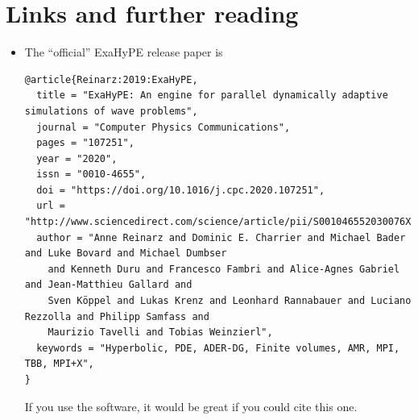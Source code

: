 \section*{Links and further reading}

\begin{itemize}
  \item The ``official'' ExaHyPE release paper is
{\tiny \begin{verbatim}
@article{Reinarz:2019:ExaHyPE,   
  title = "ExaHyPE: An engine for parallel dynamically adaptive simulations of wave problems",
  journal = "Computer Physics Communications",
  pages = "107251",
  year = "2020",
  issn = "0010-4655",
  doi = "https://doi.org/10.1016/j.cpc.2020.107251",
  url = "http://www.sciencedirect.com/science/article/pii/S001046552030076X",
  author = "Anne Reinarz and Dominic E. Charrier and Michael Bader and Luke Bovard and Michael Dumbser 
    and Kenneth Duru and Francesco Fambri and Alice-Agnes Gabriel and Jean-Matthieu Gallard and 
    Sven Köppel and Lukas Krenz and Leonhard Rannabauer and Luciano Rezzolla and Philipp Samfass and 
    Maurizio Tavelli and Tobias Weinzierl",
  keywords = "Hyperbolic, PDE, ADER-DG, Finite volumes, AMR, MPI, TBB, MPI+X",
}
  \end{verbatim}}
  If you use the software, it would be great if you could cite this one.
\end{itemize}

